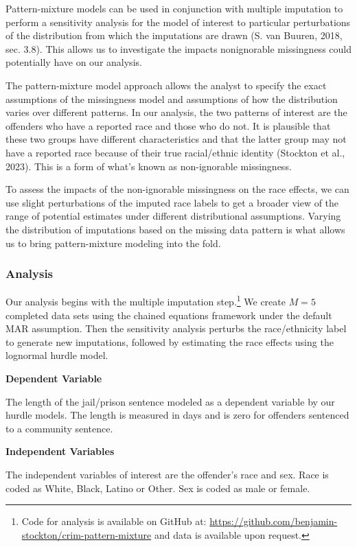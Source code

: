 \documentclass[
  letterpaper,
  DIV=11,
  numbers=noendperiod]{scrartcl}
\begin{document}
Pattern-mixture models can be used in conjunction with multiple
imputation to perform a sensitivity analysis for the model of interest
to particular perturbations of the distribution from which the
imputations are drawn (S. van Buuren, 2018, sec. 3.8). This allows us to
investigate the impacts nonignorable missingness could potentially have
on our analysis.

The pattern-mixture model approach allows the analyst to specify the
exact assumptions of the missingness model and assumptions of how the
distribution varies over different patterns. In our analysis, the two
patterns of interest are the offenders who have a reported race and
those who do not. It is plausible that these two groups have different
characteristics and that the latter group may not have a reported race
because of their true racial/ethnic identity (Stockton et al., 2023).
This is a form of what's known as non-ignorable missingness.

To assess the impacts of the non-ignorable missingness on the race
effects, we can use slight perturbations of the imputed race labels to
get a broader view of the range of potential estimates under different
distributional assumptions. Varying the distribution of imputations
based on the missing data pattern is what allows us to bring
pattern-mixture modeling into the fold.

\hypertarget{analysis}{%
\subsubsection{Analysis}\label{analysis}}

Our analysis begins with the multiple imputation step.\footnote{Code for
  analysis is available on GitHub at:
  \url{https://github.com/benjamin-stockton/crim-pattern-mixture} and
  data is available upon request.} We create \(M = 5\) completed data
sets using the chained equations framework under the default MAR
assumption. Then the sensitivity analysis perturbs the race/ethnicity
label to generate new imputations, followed by estimating the race
effects using the lognormal hurdle model.

\textbf{Dependent Variable}

The length of the jail/prison sentence modeled as a dependent variable
by our hurdle models. The length is measured in days and is zero for
offenders sentenced to a community sentence.

\textbf{Independent Variables}

The independent variables of interest are the offender's race and sex.
Race is coded as White, Black, Latino or Other. Sex is coded as male or
female.
\end{document}
